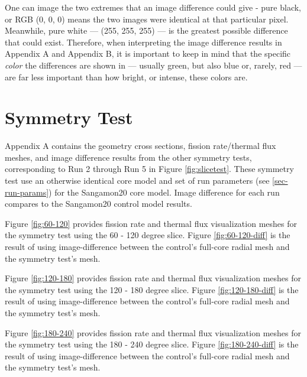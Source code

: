 One can image the two extremes that an image difference could give - pure black, or RGB (0, 0, 0) means the two images were identical at that particular pixel.  Meanwhile, pure white --- (255, 255, 255) --- is the greatest possible difference that could exist.  Therefore, when interpreting the image difference results in Appendix A and Appendix B, it is important to keep in mind that the specific \emph{color} the differences are shown in --- usually green, but also blue or, rarely, red --- are far less important than how bright, or intense, these colors are.

\section{Symmetry Test}
\label{app-sym}

Appendix A contains the geometry cross sections, fission rate/thermal flux meshes, and image difference results from the other symmetry tests, corresponding to Run 2 through Run 5 in Figure \ref{fig:slicetest}.  These symmetry test use an otherwise identical core model and set of run parameters (see \autoref{sec-run-params}) for the Sangamon20 core model.  Image difference for each run compares to the Sangamon20 control model results.





Figure \ref{fig:60-120} provides fission rate and thermal flux visualization meshes for the symmetry test using the 60 - 120 degree slice.  Figure \ref{fig:60-120-diff} is the result of using image-difference between the control's full-core radial mesh and the symmetry test's mesh.




Figure \ref{fig:120-180} provides fission rate and thermal flux visualization meshes for the symmetry test using the 120 - 180 degree slice.  Figure \ref{fig:120-180-diff} is the result of using image-difference between the control's full-core radial mesh and the symmetry test's mesh.




Figure \ref{fig:180-240} provides fission rate and thermal flux visualization meshes for the symmetry test using the 180 - 240 degree slice.  Figure \ref{fig:180-240-diff} is the result of using image-difference between the control's full-core radial mesh and the symmetry test's mesh.




